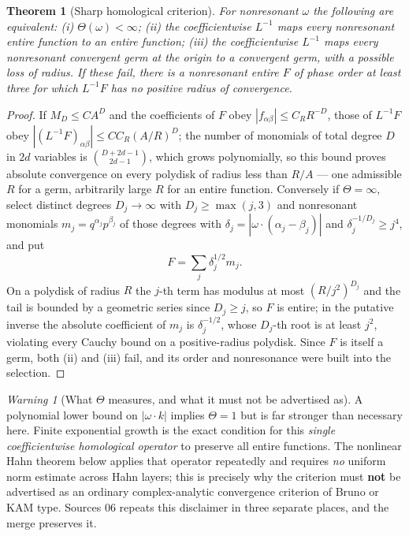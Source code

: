 \documentclass[11pt,letterpaper]{article}
\newtheorem{theorem}{Theorem}[section]
\theoremstyle{definition}
\theoremstyle{remark}
\newtheorem{warning}[warning]{Warning}
\numberwithin{equation}{section}
\begin{document}
\begin{theorem}[Sharp homological criterion]\label{dyn:thm:homological}
For nonresonant $\omega$ the following are equivalent:
(i) $\Theta(\omega)<\infty$; (ii) the coefficientwise $L^{-1}$ maps every
nonresonant \emph{entire} function to an entire function; (iii) the
coefficientwise $L^{-1}$ maps every nonresonant convergent germ at the
origin to a convergent germ, with a possible loss of radius. If these fail,
there is a nonresonant entire $F$ of phase order at least three for which
$L^{-1}F$ has no positive radius of convergence.
\end{theorem}
\begin{proof}
If $M_D\le CA^{D}$ and the coefficients of $F$ obey
$|f_{\alpha\beta}|\le C_RR^{-D}$, those of $L^{-1}F$ obey
$|(L^{-1}F)_{\alpha\beta}|\le CC_R(A/R)^{D}$; the number of monomials of
total degree $D$ in $2d$ variables is $\binom{D+2d-1}{2d-1}$, which grows
polynomially, so this bound proves absolute convergence on every polydisk
of radius less than $R/A$ --- one admissible $R$ for a germ, arbitrarily
large $R$ for an entire function. Conversely if $\Theta=\infty$, select
distinct degrees $D_j\to\infty$ with $D_j\ge\max(j,3)$ and nonresonant
monomials $m_j=q^{\alpha_j}p^{\beta_j}$ of those degrees with
$\delta_j=|\omega\cdot(\alpha_j-\beta_j)|$ and
$\delta_j^{-1/D_j}\ge j^{4}$, and put
\begin{equation}\label{dyn:eq:sparseF}
 F=\sum_j\delta_j^{1/2}m_j .
\end{equation}
On a polydisk of radius $R$ the $j$-th term has modulus at most
$(R/j^{2})^{D_j}$ and the tail is bounded by a geometric series since
$D_j\ge j$, so $F$ is entire; in the putative inverse the absolute
coefficient of $m_j$ is $\delta_j^{-1/2}$, whose $D_j$-th root is at least
$j^{2}$, violating every Cauchy bound on a positive-radius polydisk. Since
$F$ is itself a germ, both (ii) and (iii) fail, and its order and
nonresonance were built into the selection.
\end{proof}

\begin{warning}[What $\Theta$ measures, and what it must not be advertised as]
\label{dyn:warn:theta}
A polynomial lower bound on $|\omega\cdot k|$ implies $\Theta=1$ but is far
stronger than necessary here. Finite exponential growth is the exact
condition for this \emph{single coefficientwise homological operator} to
preserve all entire functions. The nonlinear Hahn theorem below applies
that operator repeatedly and requires \emph{no} uniform norm estimate
across Hahn layers; this is precisely why the criterion must
\textbf{not} be advertised as an ordinary complex-analytic convergence
criterion of Bruno or KAM type. Sources 06 repeats this disclaimer in three
separate places, and the merge preserves it.
\end{warning}
\end{document}
